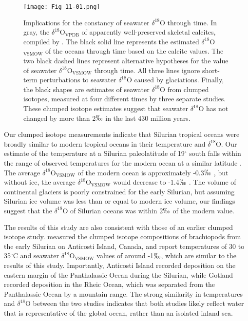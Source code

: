 \documentclass[5p, authoryear]{elsarticle}
\begin{document}
\begin{figure}[tb]
\centering
\texttt{[image: Fig\_11-01.png]}
\caption{Implications for the constancy of seawater $\delta^{18}$O through time. In gray, the $\delta^{18}$O$_{\text{VPDB}}$ of apparently well-preserved skeletal calcites, compiled by \cite{Veizer1999}. The black solid line represents the estimated $\delta^{18}$O$_{\text{VSMOW}}$ of the oceans through time based on the calcite values. The two black dashed lines represent alternative hypotheses for the value of seawater $\delta^{18}$O$_{\text{VSMOW}}$ through time. All three lines ignore short-term perturbations to seawater $\delta^{18}$O caused by glaciations. Finally, the black shapes are estimates of seawater $\delta^{18}$O from clumped isotopes, measured at four different times by three separate studies. These clumped isotope estimates suggest that seawater $\delta^{18}$O has not changed by more than 2$\permil$ in the last 430 million years.}
\label{Veizer}
\end{figure}

Our clumped isotope measurements indicate that Silurian tropical oceans were broadly similar to modern tropical oceans in their temperature and $\delta^{18}$O. Our estimate of the temperature at a Silurian paleolatitude of 19$^{\circ}$ south \citep{Torsvik1992} falls within the range of observed temperatures for the modern ocean at a similar latitude \citep{Reynolds1994}. The average $\delta^{18}$O$_{\text{VSMOW}}$ of the modern ocean is approximately -0.3$\permil$ \citep{Shackleton1974}, but without ice, the average $\delta^{18}$O$_{\text{VSMOW}}$ would decrease to -1.4$\permil$ \citep{Lhomme2005}. The volume of continental glaciers is poorly constrained for the early Silurian, but assuming Silurian ice volume was less than or equal to modern ice volume, our findings suggest that the $\delta^{18}$O of Silurian oceans was within 2$\permil$ of the modern value. 

The results of this study are also consistent with those of an earlier clumped isotope study. \cite{Came2007} measured the clumped isotope compositions of brachiopods from the early Silurian on Anticosti Island, Canada, and report temperatures of 30 to 35$^{\circ}$C and seawater $\delta^{18}$O$_{\text{VSMOW}}$ values of around -1$\permil$, which are similar to the results of this study. Importantly, Anticosti Island recorded deposition on the eastern margin of the Panthalassic Ocean during the Silurian, while Gotland recorded deposition in the Rheic Ocean, which was separated from the Panthalassic Ocean by a mountain range. The strong similarity in temperatures and $\delta^{18}$O between the two studies indicates that both studies likely reflect water that is representative of the global ocean, rather than an isolated inland sea. 
\end{document}
